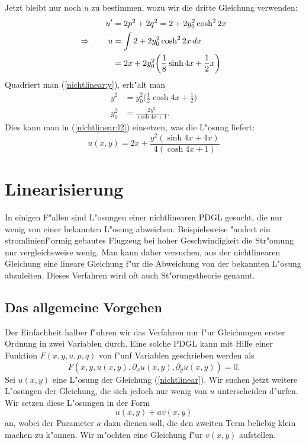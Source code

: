 Jetzt bleibt nur noch $u$ zu bestimmen, wozu wir die dritte Gleichung
verwenden:
\begin{align}
u'&=2p^2+2q^2=
2 + 2y_0^2\cosh^22x
\notag
\\
\Rightarrow\qquad
u&=\int
2 + 2y_0^2\cosh^22x
\,dx
\notag
\\
&=2x +2y_0^2\biggl(\frac18\sinh 4x+\frac12x\biggr)
\label{nichtlinear:l2}
\end{align}
Quadriert man (\ref{nichtlinear:y}), erh"alt man
\begin{align*}
y^2
&=
y_0^2\biggl(\frac12\cosh 4x+\frac12\biggr)
\\
y_0^2&=\frac{2y^2}{\cosh4x + 1}.
\end{align*}
Dies kann man in (\ref{nichtlinear:l2}) einsetzen, was die L"osung
liefert:
\begin{equation}
u(x,y)
=
2x+\frac{y^2(\sinh4x+4x)}{4(\cosh4x+1)}
\label{nichtlinear:loesung}
\end{equation}

\section{Linearisierung}
In einigen F"allen sind L"osungen einer nichtlinearen PDGL gesucht, die 
nur wenig von einer bekannten L"osung abweichen. Beispielsweise "andert
ein stromlinienf"ormig gebautes Flugzeug bei hoher Geschwindigkeit die
Str"omung nur vergleichsweise wenig. Man kann daher versuchen, aus der
nichtlinearen Gleichung eine lineare Gleichung f"ur die Abweichung
von der bekannten L"osung abzuleiten. Dieses Verfahren wird oft auch
St"orungstheorie genannt.

\subsection{Das allgemeine Vorgehen}
Der Einfachheit halber f"uhren wir das Verfahren nur f"ur Gleichungen
erster Ordnung in zwei Variablen durch. Eine solche PDGL kann mit Hilfe
einer Funktion $F(x,y,u,p,q)$ von f"unf Variablen geschrieben werden als
\begin{equation}
F(x,y,u(x,y), \partial_xu(x,y),\partial_yu(x,y))=0.
\label{nichtlinear}
\end{equation}
Sei $u(x,y)$ eine L"osung der Gleichung (\ref{nichtlinear}). Wir suchen
jetzt weitere L"osungen der Gleichung, die sich jedoch nur wenig von
$u$ unterscheiden d"urfen. Wir setzen diese L"osungen in der Form
\begin{equation}
u(x,y)+av(x,y)
\label{linearisierungansatz}
\end{equation}
an, wobei der Parameter $a$ dazu dienen soll, die den
zweiten Term beliebig klein machen zu k"onnen. Wir m"ochten eine Gleichung
f"ur $v(x,y)$ aufstellen.

